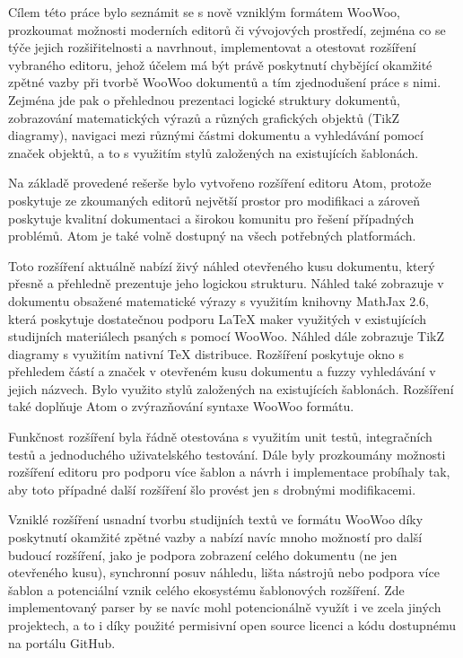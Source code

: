 Cílem této práce bylo seznámit se s nově vzniklým formátem WooWoo, prozkoumat možnosti moderních editorů či vývojových
prostředí, zejména co se týče jejich rozšiřitelnosti a navrhnout, implementovat a otestovat rozšíření vybraného editoru,
jehož účelem má být právě poskytnutí chybějící okamžité zpětné vazby při tvorbě WooWoo dokumentů a tím zjednodušení
práce s nimi. Zejména jde pak o přehlednou prezentaci logické struktury dokumentů, zobrazování matematických výrazů a
různých grafických objektů (TikZ diagramy), navigaci mezi různými částmi dokumentu a vyhledávání pomocí značek objektů,
a to s využitím stylů založených na existujících šablonách.

Na základě provedené rešerše bylo vytvořeno rozšíření editoru Atom, protože poskytuje ze zkoumaných editorů největší
prostor pro modifikaci a zároveň poskytuje kvalitní dokumentaci a širokou komunitu pro řešení případných problémů. Atom
je také volně dostupný na všech potřebných platformách.

Toto rozšíření aktuálně nabízí živý náhled otevřeného kusu dokumentu, který přesně a přehledně prezentuje jeho logickou
strukturu. Náhled také zobrazuje v dokumentu obsažené matematické výrazy s využitím knihovny MathJax 2.6, která
poskytuje dostatečnou podporu \LaTeX{} maker využitých v existujících studijních materiálech psaných s pomocí WooWoo.
Náhled dále zobrazuje TikZ diagramy s využitím nativní \TeX{} distribuce. Rozšíření poskytuje okno s přehledem částí a
značek v otevřeném kusu dokumentu a fuzzy vyhledávání v jejich názvech. Bylo využito stylů založených na existujících
šablonách. Rozšíření také doplňuje Atom o zvýrazňování syntaxe WooWoo formátu.

Funkčnost rozšíření byla řádně otestována s využitím unit testů, integračních testů a jednoduchého uživatelského
testování. Dále byly prozkoumány možnosti rozšíření editoru pro podporu více šablon a návrh i implementace probíhaly
tak, aby toto případné další rozšíření šlo provést jen s drobnými modifikacemi.

Vzniklé rozšíření usnadní tvorbu studijních textů ve formátu WooWoo díky poskytnutí okamžité zpětné vazby a nabízí navíc
mnoho možností pro další budoucí rozšíření, jako je podpora zobrazení celého dokumentu (ne jen otevřeného kusu),
synchronní posuv náhledu, lišta nástrojů nebo podpora více šablon a potenciální vznik celého ekosystému šablonových
rozšíření. Zde implementovaný parser by se navíc mohl potencionálně využít i ve zcela jiných projektech, a to i díky
použité permisivní open source licenci a kódu dostupnému na portálu GitHub.
